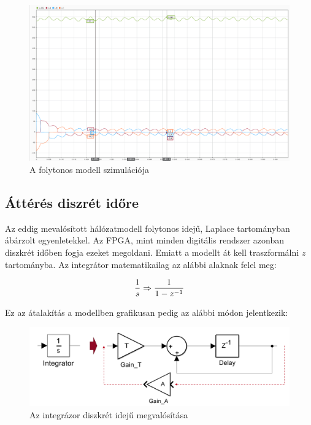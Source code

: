 
\begin{figure}[H!]
	\centering
	\includegraphics[width = \textwidth]{figures/continous_testrun_1.png}
	\caption{A folytonos modell szimulációja} 
	\label{fig:cont_run}
\end{figure}


\subsection{Áttérés diszrét időre}

Az eddig mevalósított hálózatmodell folytonos idejű, Laplace tartományban ábárzolt egyenletekkel. Az FPGA, mint minden digitális rendszer azonban diszkrét időben fogja ezeket megoldani. Emiatt a modellt át kell traszformálni \emph{z} tartományba. Az integrátor matematikailag az alábbi alaknak felel meg:

\begin{equation}
\centering
\frac{1}{s} \Rightarrow \frac{1}{1-z^{-1}}
\end{equation}

Ez az átalakítás a modellben grafikusan pedig az alábbi módon jelentkezik:

\begin{figure}[H!]
	\centering
	\includegraphics[width = \textwidth]{figures/integrator.png}
	\caption{Az integrázor diszkrét idejű megvalósítása} 
	\label{fig:integrator}
\end{figure}

